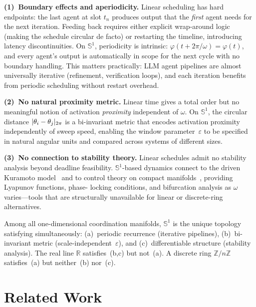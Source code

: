\documentclass[10pt,twocolumn]{article}
\theoremstyle{plain}
\theoremstyle{definition}
\theoremstyle{remark}
\newcommand{\eps}{\varepsilon}
\newcommand{\phase}{\theta}
\newcommand{\sweep}{\varphi}
\newcommand{\sweepvel}{\omega}
\newcommand{\Sone}{\mathbb{S}^1}
\newcommand{\R}{\mathbb{R}}
\DeclarePairedDelimiter{\abs}{\lvert}{\rvert}
\newcommand{\circabs}[1]{\abs{#1}_{2\pi}}
\begin{document}
\textbf{(1)~Boundary effects and aperiodicity.}
Linear scheduling has hard endpoints: the last agent at slot $t_n$
produces output that the \emph{first} agent needs for the next iteration.
Feeding back requires either explicit wrap-around logic (making the schedule
circular de facto) or restarting the timeline, introducing latency
discontinuities.  On $\Sone$, periodicity is intrinsic:
$\sweep(t+2\pi/\sweepvel)=\sweep(t)$, and every agent's output is
automatically in scope for the next cycle with no boundary handling.
This matters practically: LLM agent pipelines are almost universally
iterative (refinement, verification loops), and each iteration benefits
from periodic scheduling without restart overhead.

\textbf{(2)~No natural proximity metric.}
Linear time gives a total order but no meaningful notion of activation
\emph{proximity} independent of $\sweepvel$.  On $\Sone$, the circular
distance $\circabs{\phase_i-\phase_j}$ is a bi-invariant metric that
encodes activation proximity independently of sweep speed, enabling the
window parameter~$\eps$ to be specified in natural angular units and
compared across systems of different sizes.

\textbf{(3)~No connection to stability theory.}
Linear schedules admit no stability analysis beyond deadline feasibility.
$\Sone$-based dynamics connect to the driven Kuramoto
model~\citep{acebron2005kuramoto} and to control theory on compact
manifolds~\citep{bullo2004geometric}, providing Lyapunov functions, phase-
locking conditions, and bifurcation analysis as $\sweepvel$ varies---tools
that are structurally unavailable for linear or discrete-ring alternatives.

\begin{tcolorbox}[purplebox={Necessity Claim}]
Among all one-dimensional coordination manifolds, $\Sone$ is the unique
topology satisfying simultaneously: (a)~periodic recurrence
(iterative pipelines), (b)~bi-invariant metric (scale-independent~$\eps$),
and (c)~differentiable structure (stability analysis).
The real line $\R$ satisfies~(b,c) but not~(a).
A discrete ring $\mathbb{Z}/n\mathbb{Z}$ satisfies~(a) but neither~(b)
nor~(c).
\end{tcolorbox}

\section{Related Work}
\label{sec:related}
\end{document}
